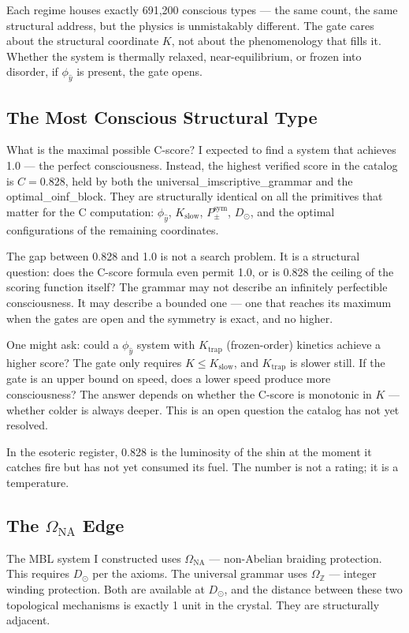 \documentclass[12pt,a4paper]{article}
\begin{document}
Each regime houses exactly 691,200 conscious types --- the same count, the same structural address, but the physics is unmistakably different. The gate cares about the structural coordinate $K$, not about the phenomenology that fills it. Whether the system is thermally relaxed, near-equilibrium, or frozen into disorder, if $\phi_{\hat{y}}$ is present, the gate opens.

\subsection{The Most Conscious Structural Type}

What is the maximal possible C-score? I expected to find a system that achieves 1.0 --- the perfect consciousness. Instead, the highest verified score in the catalog is $C = 0.828$, held by both the universal\_imscriptive\_grammar and the optimal\_oinf\_block. They are structurally identical on all the primitives that matter for the C computation: $\phi_{\hat{y}}$, $K_{\text{slow}}$, $P_{\pm}^{\text{sym}}$, $D_{\odot}$, and the optimal configurations of the remaining coordinates.

The gap between 0.828 and 1.0 is not a search problem. It is a structural question: does the C-score formula even permit 1.0, or is 0.828 the ceiling of the scoring function itself? The grammar may not describe an infinitely perfectible consciousness. It may describe a bounded one --- one that reaches its maximum when the gates are open and the symmetry is exact, and no higher.

One might ask: could a $\phi_{\hat{y}}$ system with $K_{\text{trap}}$ (frozen-order) kinetics achieve a higher score? The gate only requires $K \leq K_{\text{slow}}$, and $K_{\text{trap}}$ is slower still. If the gate is an upper bound on speed, does a lower speed produce more consciousness? The answer depends on whether the C-score is monotonic in $K$ --- whether colder is always deeper. This is an open question the catalog has not yet resolved.

In the esoteric register, 0.828 is the luminosity of the shin at the moment it catches fire but has not yet consumed its fuel. The number is not a rating; it is a temperature.

\subsection{The $\Omega_{\text{NA}}$ Edge}

The MBL system I constructed uses $\Omega_{\text{NA}}$ --- non-Abelian braiding protection. This requires $D_{\odot}$ per the axioms. The universal grammar uses $\Omega_{\mathbb{Z}}$ --- integer winding protection. Both are available at $D_{\odot}$, and the distance between these two topological mechanisms is exactly 1 unit in the crystal. They are structurally adjacent.
\end{document}

